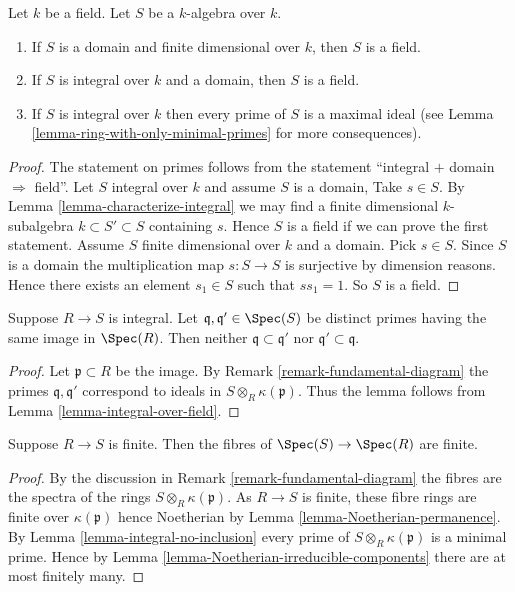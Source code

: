 \begin{lemma}
\label{lemma-integral-over-field}
Let $k$ be a field. Let $S$ be a $k$-algebra over $k$.
\begin{enumerate}
\item If $S$ is a domain and finite dimensional over $k$,
then $S$ is a field.
\item If $S$ is integral over $k$ and a domain,
then $S$ is a field.
\item If $S$ is integral over $k$ then every prime of
$S$ is a maximal ideal (see
Lemma \ref{lemma-ring-with-only-minimal-primes}
for more consequences).
\end{enumerate}
\end{lemma}

\begin{proof}
The statement on primes follows from the statement
``integral $+$ domain $\Rightarrow$ field''.
Let $S$ integral over $k$ and assume $S$ is a domain,
Take $s \in S$. By Lemma
\ref{lemma-characterize-integral} we may find a
finite dimensional $k$-subalgebra $k \subset S' \subset S$
containing $s$. Hence $S$ is a field if we can prove the
first statement. Assume $S$ finite dimensional
over $k$ and a domain. Pick $s\in S$.
Since $S$ is a domain the multiplication
map $s : S \to S$ is surjective by dimension
reasons. Hence there exists an element $s_1 \in S$
such that $ss_1 = 1$. So $S$ is a field.
\end{proof}

\begin{lemma}
\label{lemma-integral-no-inclusion}
Suppose $R \to S$ is integral.
Let $\mathfrak q, \mathfrak q' \in \Spec(S)$
be distinct primes
having the same image in $\Spec(R)$.
Then neither $\mathfrak q \subset \mathfrak q'$
nor $\mathfrak q' \subset \mathfrak q$.
\end{lemma}

\begin{proof}
Let $\mathfrak p \subset R$ be the image.
By Remark \ref{remark-fundamental-diagram}
the primes $\mathfrak q, \mathfrak q'$
correspond to ideals in
$S \otimes_R \kappa(\mathfrak p)$.
Thus the lemma follows from Lemma \ref{lemma-integral-over-field}.
\end{proof}

\begin{lemma}
\label{lemma-finite-finite-fibres}
Suppose $R \to S$ is finite.
Then the fibres of $\Spec(S) \to \Spec(R)$ are finite.
\end{lemma}

\begin{proof}
By the discussion in
Remark \ref{remark-fundamental-diagram}
the fibres are the spectra of the rings $S \otimes_R \kappa(\mathfrak p)$.
As $R \to S$ is finite, these fibre rings are finite over
$\kappa(\mathfrak p)$ hence Noetherian by
Lemma \ref{lemma-Noetherian-permanence}.
By
Lemma \ref{lemma-integral-no-inclusion}
every prime of $S \otimes_R \kappa(\mathfrak p)$ is a minimal
prime. Hence by
Lemma \ref{lemma-Noetherian-irreducible-components}
there are at most finitely many.
\end{proof}

